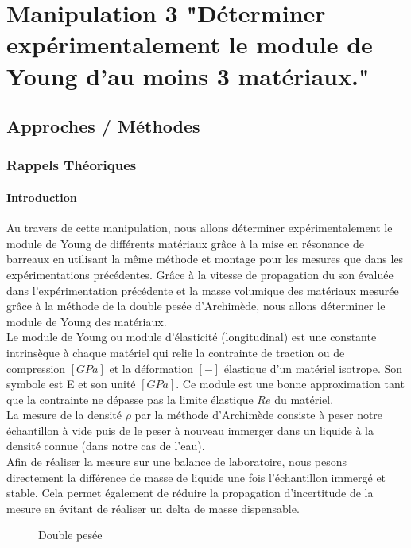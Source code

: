 \section{Manipulation 3 "Déterminer expérimentalement le module de Young d'au moins 3 matériaux."}
\subsection{Approches / Méthodes}
\subsubsection{\large Rappels Théoriques}
\paragraph{Introduction}
Au travers de cette manipulation, nous allons déterminer expérimentalement le module de Young de 
différents matériaux grâce à la mise en résonance de barreaux en utilisant la même méthode et montage
pour les mesures que dans les expérimentations précédentes. Grâce à la vitesse de propagation du son 
évaluée dans l'expérimentation précédente et la masse volumique des matériaux mesurée grâce à la 
méthode de la double pesée d'Archimède, nous allons déterminer le module de Young des matériaux.\\
Le module de Young ou module d'élasticité (longitudinal) est une constante intrinsèque
à chaque matériel qui relie la contrainte de traction ou de compression $[GPa]$ et la déformation 
$[-]$ élastique d'un matériel isotrope. Son symbole est E et son unité $[GPa]$. Ce module est une bonne
 approximation tant que la contrainte ne dépasse pas la limite élastique $Re$ du matériel. 
 ~\cite{wiki-mod-young}\\
La mesure de la densité $\rho$ par la méthode d'Archimède consiste à peser notre échantillon à vide
puis de le peser à nouveau immerger dans un liquide à la densité connue (dans notre cas de l'eau).\\
Afin de réaliser la mesure sur une balance de laboratoire, nous pesons directement la différence de
masse de liquide une fois l'échantillon immergé et stable. Cela permet également de réduire la 
propagation d'incertitude de la mesure en évitant de réaliser un delta de masse dispensable. \\
\begin{figure}[h]
    \centering
    \caption{Double pesée}
\end{figure}\\
